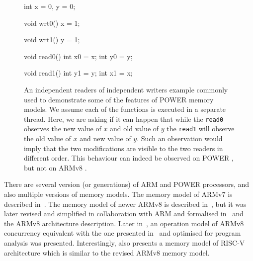 \begin{figure}[tp]
    \begin{cppcode}
        int x = 0, y = 0;
    \end{cppcode}
    \begin{multicols}{4}
        \begin{cppcode}
          void wrt0()
          {
            x = 1;
          }
        \end{cppcode}
        \columnbreak
        \begin{cppcode}
          void wrt1()
          {
            y = 1;
          }
        \end{cppcode}
        \columnbreak
        \begin{cppcode}
          void read0()
          {
            int x0 = x;
            int y0 = y;
          }
        \end{cppcode}
        \columnbreak
        \begin{cppcode}
          void read1()
          {
            int y1 = y;
            int x1 = x;
          }
        \end{cppcode}
    \end{multicols}
    \caption{
        An independent readers of independent writers example commonly used to
        demonstrate some of the features of POWER memory models.
        We assume each of the functions is executed in a separate thread.
        Here, we are asking if it can happen that while the \texttt{read0}
        observes the new value of $x$ and old value of $y$ the \texttt{read1}
        will observe the old value of $x$ and new value of $y$.
        Such an observation would imply that the two modifications are visible
        to the two readers in different order.
        This behaviour can indeed be observed on POWER \cite{Sarkar2011}, but
        not on ARMv8 \cite{Pulte2017}.
    }\label{fig:prelim:iriw}
\end{figure}

There are several version (or generations) of ARM and POWER processors, and
also multiple versions of memory models.
The memory model of ARMv7 is described in~.
The memory model of newer ARMv8 is described in~, but it was
later revised and simplified in collaboration with ARM and formalised
in~ and the ARMv8 architecture description.
Later in~, an operation model of ARMv8 concurrency equivalent
with the one presented in~ and optimised for program analysis
was presented.
Interestingly,  also presents a memory model of RISC-V
architecture which is similar to the revised ARMv8 memory model.

